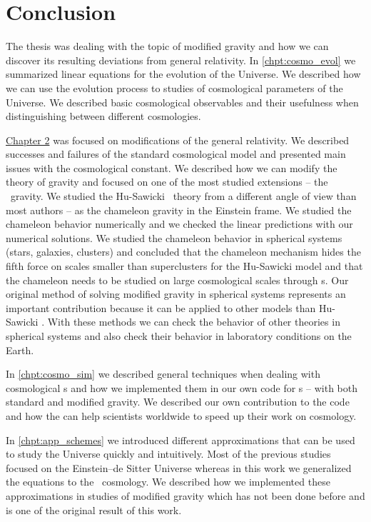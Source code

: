 \chapter*{Conclusion}
The thesis was dealing with the topic of modified gravity and how we can discover its resulting deviations from general relativity. In \autoref{chpt:cosmo_evol} we summarized linear equations for the evolution of the Universe. We described how we can use the evolution process to studies of cosmological parameters of the Universe. We described basic cosmological observables and their usefulness when distinguishing between different cosmologies.

\hyperref[chpt:de_mg]{Chapter 2} was focused on modifications of the general relativity. We described successes and failures of the standard cosmological model and presented main issues with the cosmological constant. We described how we can modify the theory of gravity and focused on one of the most studied extensions -- the \fR\ gravity. We studied the Hu-Sawicki \fR\ theory from a different angle of view than most authors -- as the chameleon gravity in the Einstein frame. We studied the chameleon behavior numerically and we checked the linear predictions with our numerical solutions. We studied the chameleon behavior in spherical systems (stars, galaxies, clusters) and concluded that the chameleon mechanism hides the fifth force on scales smaller than superclusters for the Hu-Sawicki model and that the chameleon needs to be studied on large cosmological scales through \nbodysim s. Our original method of solving modified gravity in spherical systems represents an important contribution because it can be applied to other models than Hu-Sawicki \fR. With these methods we can check the behavior of other theories in spherical systems and also check their behavior in laboratory conditions on the Earth.

In \autoref{chpt:cosmo_sim} we described general techniques when dealing with cosmological \nbodysim s and how we implemented them in our own code for \nbodysim s -- with both standard and modified gravity. We described our own contribution to the  code and how the  can help scientists worldwide to speed up their work on cosmology.

In \autoref{chpt:app_schemes} we introduced different approximations that can be used to study the Universe quickly and intuitively. Most of the previous studies focused on the Einstein--de Sitter Universe whereas in this work we generalized the equations to the \LCDM\ cosmology. We described how we implemented these approximations in studies of modified gravity which has not been done before and is one of the original result of this work.


